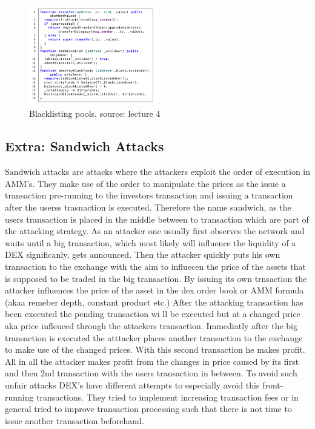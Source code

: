 \documentclass{article}
\begin{document}
\begin{figure}[h]
    \centering
    \includegraphics[width=0.5\textwidth]{Bildschirmfoto 2024-04-02 um 16.33.28.png} %
    \caption{Blacklisting pools, \scriptsize{source: lecture 4}}
    \label{fig:DoS-attack}
\end{figure}

\subsection{Extra: Sandwich Attacks}
Sandwich attacks are attacks where the attackers exploit the order of execution in AMM's. They make use of the order to manipulate the prices as the issue a transaction pre-running to the investors transaction and issuing a transaction after the userss trasnaction is executed. Therefore the name sandwich, as the users transaction is placed in the middle between to transaction which are part of the attacking strategy. As an attacker one usually first observes the network and waits until a big transaction, which most likely will influence the liquidity of a DEX significanly, gets announced. Then the attacker quickly puts his own transaction to the exchange with the aim to influecen the price of the assets that is supposed to be traded in the big transaction. By issuing its own trnsaction the attacker influences the price of the asset in the dex order book or AMM formula (akaa remeber depth, constant product etc.) After the attacking transaction has been executed the pending transaction wi ll be executed but at a changed price aka price infleuced through the attackers transaction. Immediatly after the big transaction is executed the atttacker places another transaction to the exchange to make use of the changed prices. With this second transaction he makes profit. All in all the attacker makes profit from the changes in price caused by its first and then 2nd transaction with the users transaction in between.
To avoid such unfair attacks DEX's have different attempts to especially avoid this front-running transactions. They tried to implement increasing transaction fees or in general tried to improve transaction processing such that there is not time to issue another transaction beforehand.
\end{document}
